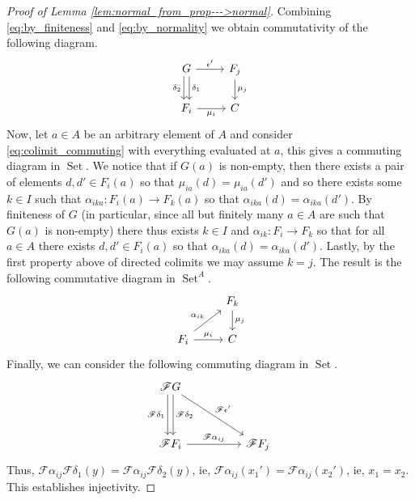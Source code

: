 \documentclass[12pt]{article}
\theoremstyle{plain}
\theoremstyle{definition}
\newcommand{\scr}[1]{\mathscr{#1}}
\newcommand{\lto}{\longrightarrow}
\DeclareMathOperator{\set}{Set}
\begin{document}
\begin{proof}[Proof of Lemma \ref{lem:normal_from_prop--->normal}]
		Combining \eqref{eq:by_finiteness} and \eqref{eq:by_normality} we obtain commutativity of the following diagram.
		\begin{equation}\label{eq:colimit_commuting}
			\begin{tikzcd}
				G\arrow[r,"{\epsilon'}"]\arrow[d,shift left,"{\delta_1}"]\arrow[d, swap, shift right, "{\delta_2}"] & F_j\arrow[d,"{\mu_j}"]\\
				F_i\arrow[r,swap,"{\mu_i}"] & C
				\end{tikzcd}
			\end{equation}
		Now, let $a \in A$ be an arbitrary element of $A$ and consider \eqref{eq:colimit_commuting} with everything evaluated at $a$, this gives a commuting diagram in $\set$. We notice that if $G(a)$ is non-empty, then there exists a pair of elements $d,d' \in F_i(a)$ so that $\mu_{ia}(d) = \mu_{ia}(d')$ and so there exists some $k \in I$ such that $\alpha_{ika}: F_{i}(a) \lto F_k(a)$ so that $\alpha_{ika}(d) = \alpha_{ika}(d')$. By finiteness of $G$ (in particular, since all but finitely many $a \in A$ are such that $G(a)$ is non-empty) there thus exists $k \in I$ and $\alpha_{ik}: F_i \lto F_k$ so that for all $a \in A$ there exists $d,d' \in F_i(a)$ so that $\alpha_{ika}(d) = \alpha_{ika}(d')$. Lastly, by the first property above of directed colimits we may assume $k = j$. The result is the following commutative diagram in $\set^A$.
		\begin{equation}
			\begin{tikzcd}
				& F_k\arrow[d,"{\mu_j}"]\\
				F_i\arrow[ur,"{\alpha_{ik}}"]\arrow[r,"{\mu_i}"] & C
				\end{tikzcd}
			\end{equation}
		Finally, we can consider the following commuting diagram in $\set$.
		\begin{equation}
			\begin{tikzcd}[column sep = huge, row sep = huge]
			\scr{F}G\arrow[dr,"{\scr{F}\epsilon'}"]\arrow[d,shift right, swap, "{\scr{F}\delta_1}"]\arrow[d,shift left, "{\scr{F}\delta_2}"]\\
			\scr{F}F_i\arrow[r,"{\scr{F}\alpha_{ij}}"]& \scr{F}F_j
			\end{tikzcd}
			\end{equation}
		Thus, $\scr{F}\alpha_{ij}\scr{F}\delta_1(y) = \scr{F}\alpha_{ij}\scr{F}\delta_2(y)$, ie, $\scr{F}\alpha_{ij}(x_1') = \scr{F}\alpha_{ij}(x_2')$, ie, $x_1 = x_2$. This establishes injectivity.

\end{proof}
\end{document}
